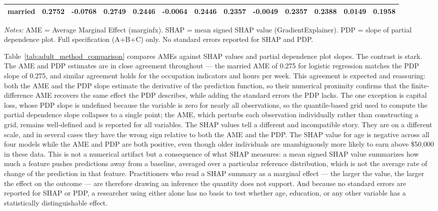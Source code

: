 \documentclass[conference]{IEEEtran}
\begin{document}
\begin{table}[htbp]
\begin{threeparttable}
\begin{tabular}{lrrrrrrrrrrrr}
				married & 0.2752 & -0.0768 & 0.2749 & 0.2446 & -0.0064 & 0.2446 & 0.2357 & -0.0049 & 0.2357 & 0.2388 & 0.0149 & 0.1958 \\
				\bottomrule
				\end{tabular}
				\begin{tablenotes}
				\footnotesize
				\item \textit{Notes:} AME = Average Marginal Effect (marginfx). SHAP = mean signed SHAP value (GradientExplainer). PDP = slope of partial dependence plot. Full specification (A+B+C) only. No standard errors reported for SHAP and PDP.
				\end{tablenotes}
		\end{threeparttable}
	\end{table}
	
	Table~\ref{tab:adult_method_comparison} compares AMEs against SHAP values and partial dependence plot slopes. The contrast is stark. The AME and PDP estimates are in close agreement throughout --- the married AME of 0.275 for logistic regression matches the PDP slope of 0.275, and similar agreement holds for the occupation indicators and hours per week. This agreement is expected and reassuring: both the AME and the PDP slope estimate the derivative of the prediction function, so their numerical proximity confirms that the finite-difference AME recovers the same effect the PDP describes, while adding the standard errors the PDP lacks. The one exception is capital loss, whose PDP slope is undefined because the variable is zero for nearly all observations, so the quantile-based grid used to compute the partial dependence slope collapses to a single point; the AME, which perturbs each observation individually rather than constructing a grid, remains well-defined and is reported for all variables. The SHAP values tell a different and incompatible story. They are on a different scale, and in several cases they have the wrong sign relative to both the AME and the PDP. The SHAP value for age is negative across all four models while the AME and PDP are both positive, even though older individuals are unambiguously more likely to earn above \$50{,}000 in these data. This is not a numerical artifact but a consequence of what SHAP measures: a mean signed SHAP value summarizes how much a feature pushes predictions away from a baseline, averaged over a particular reference distribution, which is not the average rate of change of the prediction in that feature. Practitioners who read a SHAP summary as a marginal effect --- the larger the value, the larger the effect on the outcome --- are therefore drawing an inference the quantity does not support. And because no standard errors are reported for SHAP or PDP, a researcher using either alone has no basis to test whether age, education, or any other variable has a statistically distinguishable effect.
	
\end{document}
